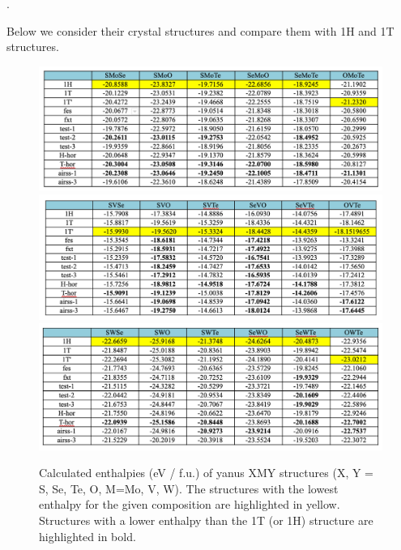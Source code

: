 .\documentclass[a4paperm]{article}
\begin{document}
Below we consider their crystal structures and compare them with 1H and 1T structures.
\begin{figure}[H]
	\includegraphics[width=\textwidth]{Mo_H.png}
	\includegraphics[width=\textwidth]{W_H.png}
	\includegraphics[width=\textwidth]{V_H.png}
        \caption{Calculated enthalpies (eV / f.u.) of yanus XMY structures (X, Y = S, Se, Te, O, M=Mo, V, W). The structures with the lowest enthalpy for the given composition are highlighted in yellow. Structures with a lower enthalpy than the 1T (or 1H) structure are highlighted in bold.}
\label{enth}
\end{figure}
\end{document}
